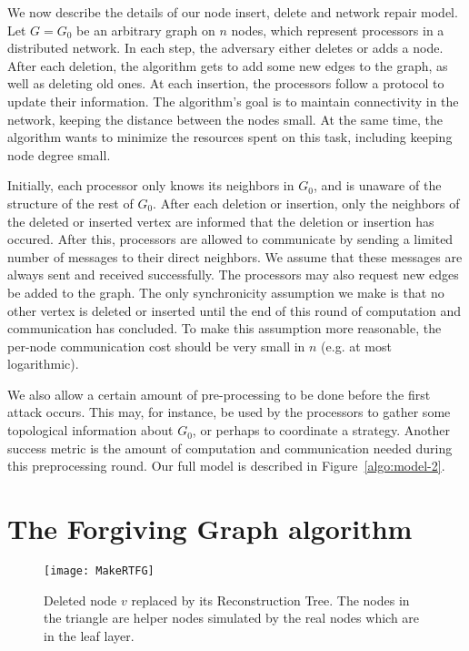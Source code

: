 \documentclass[11pt, letter]{article}
\begin{document}
We now describe the details of our node insert, delete and network repair model.  Let $G = G_0$ be an arbitrary graph on
$n$ nodes,
which represent processors in a distributed network.  In each step, the adversary either deletes or adds a node. 
After each
deletion, the algorithm gets to add some new edges to the graph, as well as deleting old ones.  At each insertion, the
processors follow a protocol to update their information.
The algorithm's goal is to maintain connectivity in the network, keeping the distance between the nodes small.  At the
same time, the algorithm wants to
minimize the resources spent on this task, including keeping node degree small.  



Initially, each processor only knows its neighbors in $G_0$, and is unaware of the structure of the rest of $G_0$.
After each deletion or insertion, only the neighbors of the deleted or inserted vertex are informed that
the deletion or insertion has occured. After this, processors are allowed to communicate by sending a limited number
of messages to their direct  neighbors.  We assume that these messages are always sent and received successfully.  The
processors may also request new edges be added to the graph. The only synchronicity assumption we make is that no
other  vertex is deleted or inserted until the end of this round of computation and communication has concluded.
To make this assumption more reasonable, the per-node communication cost should be very small in $n$ (e.g. at most logarithmic).


We also allow a certain amount of pre-processing to be done before the first attack occurs.  This may, for instance,
be used by the processors to gather some topological information about $G_0$, or perhaps to 
coordinate a strategy.  Another success metric is the amount of computation and communication needed during this
preprocessing round.  Our full model is described in Figure~\ref{algo:model-2}.



\section{The Forgiving Graph algorithm}
\label{sec:algorithm}

\begin{figure}[t!]
\centering
\texttt{[image: MakeRTFG]}
\caption{Deleted node $v$ replaced by its Reconstruction Tree. The nodes in the triangle are helper nodes
simulated by the real nodes which are in the leaf layer.}
 \label{fig: RT}
\end{figure}
\end{document}
